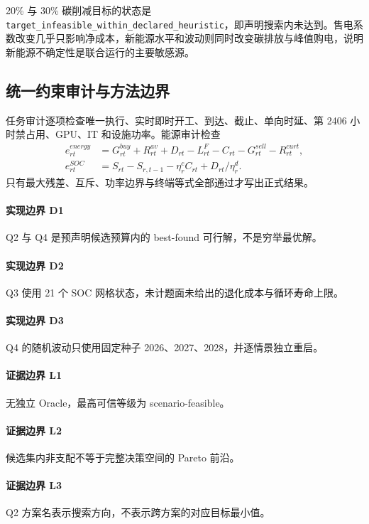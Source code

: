 20\% 与 30\% 碳削减目标的状态是 \texttt{target\_infeasible\_within\_declared\_heuristic}，即声明搜索内未达到。售电系数改变几乎只影响净成本，新能源水平和波动则同时改变碳排放与峰值购电，说明新能源不确定性是联合运行的主要敏感源。

\subsection{统一约束审计与方法边界}
任务审计逐项检查唯一执行、实时即时开工、到达、截止、单向时延、第 2406 小时禁占用、GPU、IT 和设施功率。能源审计检查
\begin{align}
e^{energy}_{rt}&=G^{buy}_{rt}+R^{av}_{rt}+D_{rt}-L^F_{rt}-C_{rt}-G^{sell}_{rt}-R^{curt}_{rt},\\
e^{SOC}_{rt}&=S_{rt}-S_{r,t-1}-\eta_r^cC_{rt}+D_{rt}/\eta_r^d.
\end{align}
只有最大残差、互斥、功率边界与终端等式全部通过才写出正式结果。

\paragraph{实现边界 D1}Q2 与 Q4 是预声明候选预算内的 best-found 可行解，不是穷举最优解。
\paragraph{实现边界 D2}Q3 使用 21 个 SOC 网格状态，未计题面未给出的退化成本与循环寿命上限。
\paragraph{实现边界 D3}Q4 的随机波动只使用固定种子 2026、2027、2028，并逐情景独立重启。
\paragraph{证据边界 L1}无独立 Oracle，最高可信等级为 scenario-feasible。
\paragraph{证据边界 L2}候选集内非支配不等于完整决策空间的 Pareto 前沿。
\paragraph{证据边界 L3}Q2 方案名表示搜索方向，不表示跨方案的对应目标最小值。
